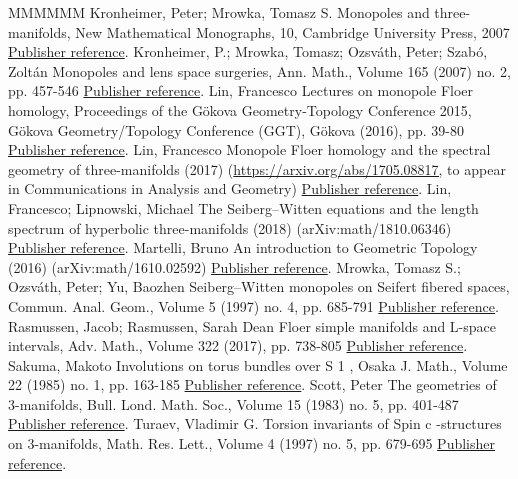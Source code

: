 \documentclass[11pt]{article}
\theoremstyle{definition}
\numberwithin{equation}{section}
\numberwithin{figure}{section}
\numberwithin{table}{section}
\begin{document}
\begin{thebibliography}{MMMMMM}
 Kronheimer, Peter; Mrowka, Tomasz S. Monopoles and three-manifolds, New Mathematical Monographs, 10, Cambridge University Press, 2007 \href{https://ahl.centre-mersenne.org/item/AHL_2020__3__1117_0/#KM}{Publisher reference}.
 Kronheimer, P.; Mrowka, Tomasz; Ozsváth, Peter; Szabó, Zoltán Monopoles and lens space surgeries, Ann. Math., Volume 165 (2007) no. 2, pp. 457-546 \href{https://ahl.centre-mersenne.org/item/AHL_2020__3__1117_0/#KMOS}{Publisher reference}.
 Lin, Francesco Lectures on monopole Floer homology, Proceedings of the Gökova Geometry-Topology Conference 2015, Gökova Geometry/Topology Conference (GGT), Gökova (2016), pp. 39-80 \href{https://ahl.centre-mersenne.org/item/AHL_2020__3__1117_0/#Lin3}{Publisher reference}.
 Lin, Francesco Monopole Floer homology and the spectral geometry of three-manifolds (2017) (\url{https://arxiv.org/abs/1705.08817,} to appear in Communications in Analysis and Geometry) \href{https://ahl.centre-mersenne.org/item/AHL_2020__3__1117_0/#Lin4}{Publisher reference}.
 Lin, Francesco; Lipnowski, Michael The Seiberg–Witten equations and the length spectrum of hyperbolic three-manifolds (2018) (arXiv:math/1810.06346) \href{https://ahl.centre-mersenne.org/item/AHL_2020__3__1117_0/#LL}{Publisher reference}.
 Martelli, Bruno An introduction to Geometric Topology (2016) (arXiv:math/1610.02592) \href{https://ahl.centre-mersenne.org/item/AHL_2020__3__1117_0/#Mar}{Publisher reference}.
 Mrowka, Tomasz S.; Ozsváth, Peter; Yu, Baozhen Seiberg–Witten monopoles on Seifert fibered spaces, Commun. Anal. Geom., Volume 5 (1997) no. 4, pp. 685-791 \href{https://ahl.centre-mersenne.org/item/AHL_2020__3__1117_0/#MOY}{Publisher reference}.
 Rasmussen, Jacob; Rasmussen, Sarah Dean Floer simple manifolds and L-space intervals, Adv. Math., Volume 322 (2017), pp. 738-805 \href{https://ahl.centre-mersenne.org/item/AHL_2020__3__1117_0/#RR}{Publisher reference}.
 Sakuma, Makoto Involutions on torus bundles over S 1 , Osaka J. Math., Volume 22 (1985) no. 1, pp. 163-185 \href{https://ahl.centre-mersenne.org/item/AHL_2020__3__1117_0/#Sak}{Publisher reference}.
 Scott, Peter The geometries of 3-manifolds, Bull. Lond. Math. Soc., Volume 15 (1983) no. 5, pp. 401-487 \href{https://ahl.centre-mersenne.org/item/AHL_2020__3__1117_0/#Sco}{Publisher reference}.
 Turaev, Vladimir G. Torsion invariants of  Spin  c -structures on 3-manifolds, Math. Res. Lett., Volume 4 (1997) no. 5, pp. 679-695 \href{https://ahl.centre-mersenne.org/item/AHL_2020__3__1117_0/#Tur}{Publisher reference}.
\end{thebibliography}
\end{document}
